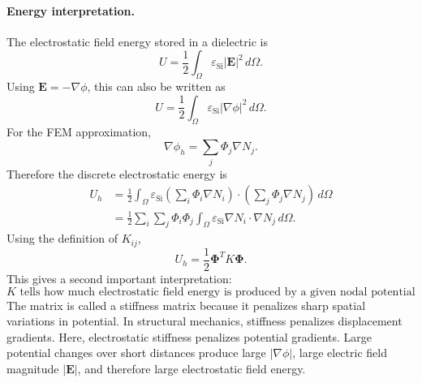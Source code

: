 \documentclass[11pt]{article}
\newcommand{\Evec}{\mathbf{E}}
\begin{document}
\paragraph{Energy interpretation.}
The electrostatic field energy stored in a dielectric is
\begin{equation}
U
= \frac{1}{2}\int_{\Omega} \varepsilon_{\mathrm{Si}} |\Evec|^2 \, d\Omega.
\end{equation}
Using $\Evec=-\nabla \phi$, this can also be written as
\begin{equation}
U
= \frac{1}{2}\int_{\Omega} \varepsilon_{\mathrm{Si}} |\nabla \phi|^2 \, d\Omega.
\end{equation}
For the FEM approximation,
\begin{equation}
\nabla \phi_h
= \sum_j \Phi_j \nabla N_j.
\end{equation}
Therefore the discrete electrostatic energy is
\begin{align}
U_h
&= \frac{1}{2}\int_{\Omega} \varepsilon_{\mathrm{Si}}
\left(\sum_i \Phi_i \nabla N_i\right)
\cdot
\left(\sum_j \Phi_j \nabla N_j\right)
\, d\Omega \\
&= \frac{1}{2}\sum_i\sum_j \Phi_i\Phi_j
\int_{\Omega} \varepsilon_{\mathrm{Si}} \nabla N_i\cdot \nabla N_j \, d\Omega.
\end{align}
Using the definition of $K_{ij}$,
\begin{equation}
\boxed{
U_h
= \frac{1}{2}\bm{\Phi}^T K \bm{\Phi}.
}
\end{equation}
This gives a second important interpretation:
\begin{equation}
\boxed{
K \text{ tells how much electrostatic field energy is produced by a given nodal potential distribution.}
}
\end{equation}
The matrix is called a stiffness matrix because it penalizes sharp spatial variations in potential. In structural mechanics, stiffness penalizes displacement gradients. Here, electrostatic stiffness penalizes potential gradients. Large potential changes over short distances produce large $|\nabla \phi|$, large electric field magnitude $|\Evec|$, and therefore large electrostatic field energy.
\end{document}
